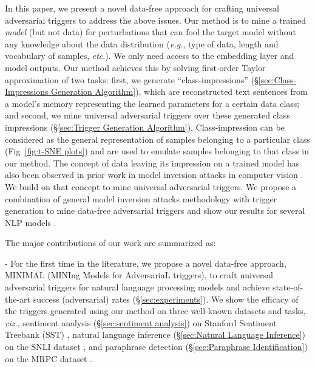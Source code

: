 In this paper, we present a novel data-free approach for crafting universal adversarial triggers to address the above issues. Our method is to mine a trained \textit{model} (but not data) for perturbations that can fool the target model without any knowledge about the data
distribution (\textit{e.g.}, type of data, length and vocabulary of samples, \textit{etc}.). We only need access to the embedding layer and model outputs. Our method achieves this by solving first-order Taylor approximation of two tasks: first, we generate ``class-impressions'' (\S\ref{sec:Class-Impressions Generation Algorithm}), which are reconstructed text sentences from a model's memory representing the learned parameters for a certain data class; and second, we mine universal adversarial triggers over these generated class impressions (\S\ref{sec:Trigger Generation Algorithm}). Class-impression can be considered as the general representation of samples belonging to a particular class (Fig~\ref{fig:t-SNE plots}) and are used to emulate samples belonging to that class in our method. The concept of data leaving its impression on a trained model has also been observed in prior work in model inversion attacks in computer vision \cite{micaelli2019zero,nayak2019zero}. We build on that concept to mine universal adversarial triggers. We propose a combination of general model inversion attacks methodology with trigger generation to mine data-free adversarial triggers and show our results for several NLP models \cite{fredrikson2015model,tramer2016stealing}.

\noindent The major contributions of our work are summarized as:

\noindent- For the first time in the literature, we propose a novel data-free approach, MINIMAL (MINIng Models for AdversariaL triggers), to craft universal adversarial triggers for natural language processing models and achieve state-of-the-art success (adversarial) rates (\S\ref{sec:experiments}). We show the efficacy of the triggers generated using our method on three well-known datasets and tasks, \textit{viz.}, sentiment analysis (\S\ref{sec:sentiment analysis}) on Stanford Sentiment Treebank (SST) \cite{socher2013recursive}, natural language inference (\S\ref{sec:Natural Language Inference}) on the SNLI dataset \cite{bowman2015large}, and paraphrase detection (\S\ref{sec:Paraphrase Identification}) on the MRPC dataset \cite{dolan2005automatically}. 



